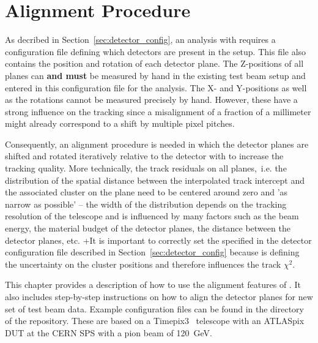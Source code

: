 \chapter{Alignment Procedure}
\label{ch:howtoalign}

As decribed in Section~\ref{sec:detector_config}, an analysis with \corry requires a configuration file defining which detectors are present in the setup.
This file also contains the position and rotation of each detector plane.
The Z-positions of all planes can \textbf{and must} be measured by hand in the existing test beam setup and entered in this configuration file for the analysis.
The X- and Y-positions as well as the rotations cannot be measured precisely by hand.
However, these have a strong influence on the tracking since a misalignment of a fraction of a millimeter might already correspond to a shift by multiple pixel pitches.

Consequently, an alignment procedure is needed in which the detector planes are shifted and rotated iteratively relative to the detector with  to increase the tracking quality.
More technically, the track residuals on all planes,~i.e. the distribution of the spatial distance between the interpolated track intercept and the associated cluster on the plane need to be centered around zero and 'as narrow as possible' -- the width of the distribution depends on the tracking resolution of the telescope and is influenced by many factors such as the beam energy, the material budget of the detector planes, the distance between the detector planes, etc.
+It is important to correctly set the  specified in the detector configuration file described in Section~\ref{sec:detector_config} because is defining the uncertainty on the cluster positions and therefore influences the track $\chi^2$.

This chapter provides a description of how to use the alignment features of \corry.
It also includes step-by-step instructions on how to align the detector planes for new set of test beam data.
Example configuration files can be found in the  directory of the repository.
These are based on a Timepix3~\cite{timepix3} telescope with an ATLASpix~\cite{atlaspix} DUT at the CERN SPS with a pion beam of \SI{120}{GeV}.

